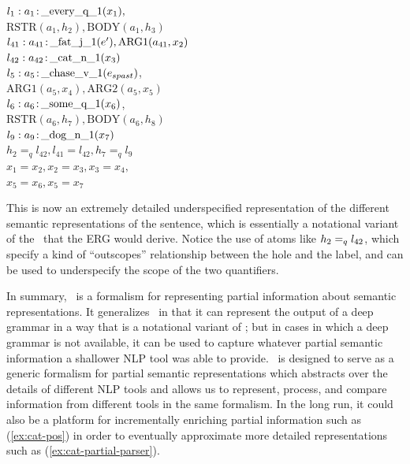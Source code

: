 \begin{examples}
\item $l_1:a_1\colon\!\mbox{\_every\_q\_1}(x_1),$\\
\hspace*{0.1in}$\mbox{RSTR}(a_1,h_2),
\mbox{BODY}(a_1,h_3)$\\ 
$l_{41}:a_{41}\colon\!\mbox{\_fat\_j\_1}(e'), \mbox{ARG1}(a_{41},x_2)$\\
$l_{42}:a_{42}\colon\!\mbox{\_cat\_n\_1}(x_3)$\\
$l_5:a_5\colon\!\mbox{\_chase\_v\_1}(e_{spast})$,\\
\hspace*{0.1in}$\mbox{ARG1}(a_5,x_4),
\mbox{ARG2}(a_5,x_5)$\\ 
$l_6:a_6\colon\!\mbox{\_some\_q\_1}(x_6)$,\\
\hspace*{0.1in}$\mbox{RSTR}(a_6,h_7),
\mbox{BODY}(a_6,h_8)$\\ 
$l_9:a_9\colon\!\mbox{\_dog\_n\_1}(x_7)$\\
$h_2=_q l_{42}, l_{41}=l_{42}, h_7 =_q l_9$\\
$x_1=x_2, x_2=x_3, x_3=x_4,$\\
$x_5=x_6, x_5=x_7$
\label{ex:cat-erg}
\end{examples}

This is now an extremely detailed underspecified representation of the
different semantic representations of the sentence, which is
essentially a notational variant of the \mrs\ that the ERG would
derive.  Notice the use of atoms like $h_2 =_q l_{42}$, which specify
a kind of ``outscopes'' relationship between the hole and the label,
and can be used to underspecify the scope of the two quantifiers.

In summary, \rmrs\ is a formalism for representing partial information
about semantic representations.  It generalizes \mrs\ in that it can
represent the output of a deep grammar in a way that is a notational
variant of \mrs; but in cases in which a deep grammar is not
available, it can be used to capture whatever partial semantic
information a shallower NLP tool was able to provide.  \rmrs\ is
designed to serve as a generic formalism for partial semantic
representations which abstracts over the details of different NLP
tools and allows us to represent, process, and compare information
from different tools in the same formalism.  In the long run, it could
also be a platform for incrementally enriching partial information
such as (\ref{ex:cat-pos}) in order to eventually approximate more
detailed representations such as (\ref{ex:cat-partial-parser}).


